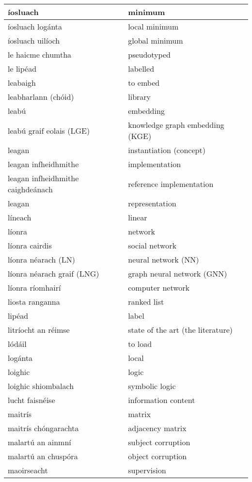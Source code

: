 \begin{longtable}{|l|l|}
		íosluach&minimum\\ \hline 
		íosluach logánta&local minimum\\ \hline 
		íosluach uilíoch&global minimum\\ \hline 
		le haicme chumtha&pseudotyped\\ \hline 
		le lipéad&labelled\\ \hline 
		leabaigh&to embed\\ \hline 
		leabharlann (chóid)&library\\ \hline 
		leabú&embedding\\ \hline 
		leabú graif eolais (LGE)&knowledge graph embedding (KGE)\\ \hline 
		leagan&instantiation (concept)\\ \hline 
		leagan infheidhmithe&implementation\\ \hline 
		leagan infheidhmithe caighdeánach&reference implementation\\ \hline 
		leagan&representation\\ \hline 
		líneach&linear\\ \hline 
		líonra&network\\ \hline 
		líonra cairdis&social network\\ \hline 
		líonra néarach (LN)&neural network (NN)\\ \hline 
		líonra néarach graif (LNG)&graph neural network (GNN)\\ \hline 
		líonra ríomhairí&computer network\\ \hline 
		liosta ranganna&ranked list\\ \hline 
		lipéad&label\\ \hline 
		litríocht an réimse&state of the art (the literature)\\ \hline 
		lódáil&to load\\ \hline 
		logánta&local\\ \hline 
		loighic&logic\\ \hline 
		loighic shiombalach&symbolic logic\\ \hline 
		lucht faisnéise&information content\\ \hline 
		maitrís&matrix\\ \hline 
		maitrís chóngarachta&adjacency matrix\\ \hline 
		malartú an ainmní&subject corruption\\ \hline 
		malartú an chuspóra&object corruption\\ \hline 
		maoirseacht&supervision\\ \hline 

\end{longtable}

